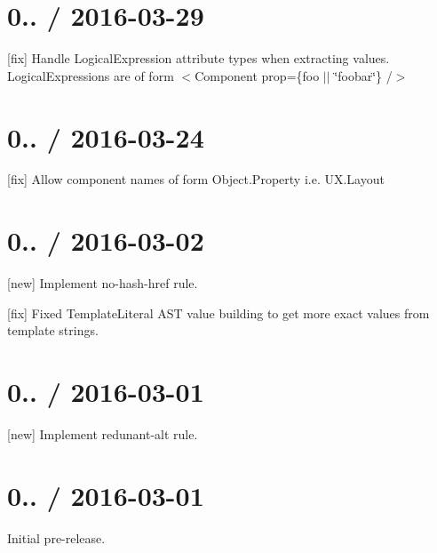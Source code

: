 \section*{0.. / 2016-\/03-\/29 }


\begin{DoxyItemize}
\item \mbox{[}fix\mbox{]} Handle Logical\+Expression attribute types when extracting values. Logical\+Expressions are of form {\ttfamily $<$Component prop=\{foo $\vert$$\vert$ \char`\"{}foobar\char`\"{}\} /$>$}
\end{DoxyItemize}

\section*{0.. / 2016-\/03-\/24 }


\begin{DoxyItemize}
\item \mbox{[}fix\mbox{]} Allow component names of form {\ttfamily Object.\+Property} i.\+e. {\ttfamily U\+X.\+Layout}
\end{DoxyItemize}

\section*{0.. / 2016-\/03-\/02 }


\begin{DoxyItemize}
\item \mbox{[}new\mbox{]} Implement no-\/hash-\/href rule.
\item \mbox{[}fix\mbox{]} Fixed Template\+Literal A\+ST value building to get more exact values from template strings.
\end{DoxyItemize}

\section*{0.. / 2016-\/03-\/01 }


\begin{DoxyItemize}
\item \mbox{[}new\mbox{]} Implement redunant-\/alt rule.
\end{DoxyItemize}

\section*{0.. / 2016-\/03-\/01 }


\begin{DoxyItemize}
\item Initial pre-\/release. 
\end{DoxyItemize}